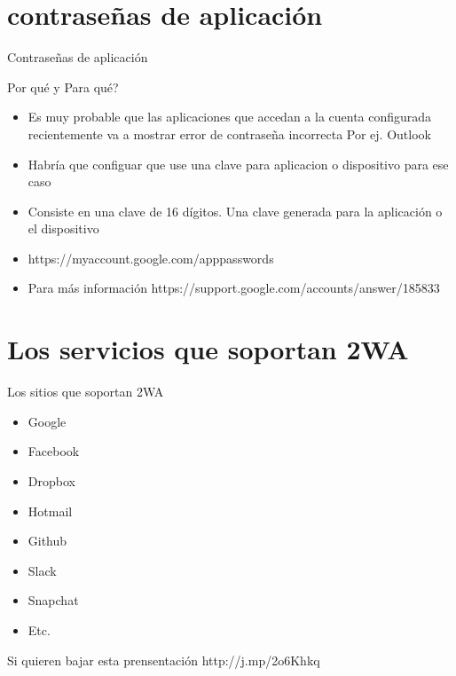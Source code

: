 \documentclass[11pt]{beamer}
\begin{document}
\section{contrase\~nas de aplicaci\'on}
\begin{frame}{Contrase\~nas de aplicaci\'on}
  \begin{block}{Por qu\'e y Para qu\'e?}
    \begin{itemize}
    	\item Es muy probable que las aplicaciones que accedan a la cuenta configurada recientemente va a mostrar error de contrase\~na incorrecta Por ej. Outlook
    	\item Habr\'ia que configuar que use una clave para aplicacion o dispositivo para ese caso
    	\item Consiste en una clave de 16 d\'igitos. Una clave generada para la aplicaci\'on o el dispositivo
    	\item https://myaccount.google.com/apppasswords 
    	\item Para m\'as informaci\'on https://support.google.com/accounts/answer/185833
    \end{itemize}
  \end{block}
\end{frame}
\section{Los servicios que soportan 2WA}
\begin{frame}
  \begin{block}{Los sitios que soportan 2WA}
    \begin{itemize}
      \item Google
      \item Facebook
      \item Dropbox
      \item Hotmail
      \item Github
      \item Slack
      \item Snapchat
      \item Etc.
    \end{itemize}
  \end{block}
\end{frame}
\begin{frame}
  \begin{block}{Si quieren bajar esta prensentaci\'on}
    http://j.mp/2o6Khkq
  \end{block}
\end{frame}
\end{document}
